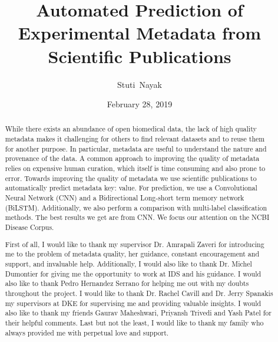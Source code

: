 \documentclass[10pt]{reportMaster}
\title{Automated Prediction of Experimental Metadata from Scientific Publications}
\author{Stuti\ Nayak}
\date{February 28, 2019}
\begin{document}
\maketitle
\begin{abstract}
While there exists an abundance of open biomedical data, the lack of high quality metadata makes it challenging for others to find relevant datasets and to reuse them for another purpose. In particular, metadata are useful to understand the nature and provenance of the data. A common approach to improving the quality of metadata relies on expensive human curation, which itself is time consuming and also prone to error. Towards improving the quality of metadata we use scientific publications to automatically predict metadata key: value. For prediction, we use a Convolutional Neural Network (CNN) and a Bidirectional Long-short term memory network (BiLSTM). Additionally, we also perform a comparison with multi-label classification methods. The best results we get are from CNN. We focus our attention on the NCBI Disease Corpus. 
\end{abstract}

\renewcommand{\abstractname}{Acknowledgements}
\begin{abstract}
First of all, I would like to thank my supervisor Dr. Amrapali Zaveri for introducing me to the problem of metadata quality, her guidance, constant encouragement and support, and invaluable help. Additionally, I would also like to thank Dr. Michel Dumontier for giving me the opportunity to work at IDS and his guidance. I would also like to thank Pedro Hernandez Serrano for helping me out with my doubts throughout the project. I would like to thank Dr. Rachel Cavill and Dr. Jerry Spanakis my supervisors at DKE for supervising me and providing valuable insights. I would also like to thank my friends Gaurav Maheshwari, Priyansh Trivedi and Yash Patel for their helpful comments. Last but not the least, I would like to thank my family who always provided me with perpetual love and support. 
 
 
\end{abstract}

\tableofcontents

\listoffigures
 
\listoftables








%

%




\end{document}
